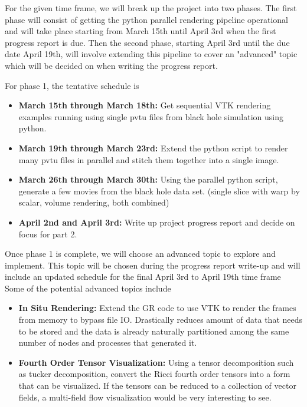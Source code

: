 For the given time frame, we will break up the project into two phases. The first phase will consist of getting the python parallel rendering pipeline operational and will take place starting from March 15th until April 3rd when the first progress report is due. Then the second phase, starting April 3rd until the due date April 19th, will involve extending this pipeline to cover an "advanced" topic which will be decided on when writing the progress report.

For phase 1, the tentative schedule is

\begin{itemize}
	\item \textbf{March 15th through March 18th:} Get sequential VTK rendering examples running using single pvtu files from black hole simulation using python.
	\item \textbf{March 19th through March 23rd:} Extend the python script to render many pvtu files in parallel and stitch them together into a single image.
	\item \textbf{March 26th through March 30th:} Using the parallel python script, generate a few movies from the black hole data set. (single slice with warp by scalar, volume rendering, both combined)
	\item \textbf{April 2nd and April 3rd:} Write up project progress report and decide on focus for part 2.
\end{itemize}

Once phase 1 is complete, we will choose an advanced topic to explore and implement. This topic will be chosen during the progress report write-up and will include an updated schedule for the final April 3rd to April 19th time frame Some of the potential advanced topics include

\begin{itemize}
	\item \textbf{In Situ Rendering:} Extend the GR code to use VTK to render the frames from memory to bypass file IO. Drastically reduces amount of data that needs to be stored and the data is already naturally partitioned among the same number of nodes and processes that generated it.
	\item \textbf{Fourth Order Tensor Visualization:} Using a tensor decomposition such as tucker decomposition, convert the Ricci fourth order tensors into a form that can be visualized. If the tensors can be reduced to a collection of vector fields, a multi-field flow visualization would be very interesting to see.
\end{itemize}